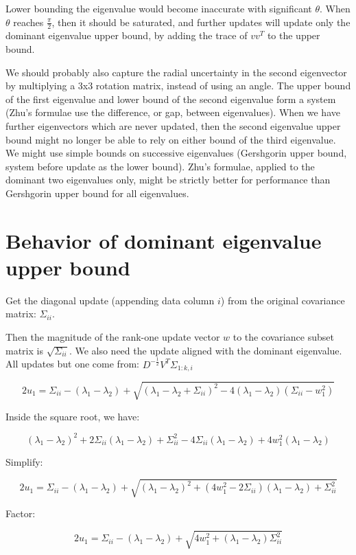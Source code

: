 \documentclass{article}
\begin{document}
Lower bounding the eigenvalue would become inaccurate with significant $\theta$. When $\theta$ reaches $\frac{\pi}{2}$, then it should be saturated, and further updates will update only the dominant eigenvalue upper bound, by adding the trace of $v v^T$ to the upper bound.

We should probably also capture the radial uncertainty in the second eigenvector by multiplying a 3x3 rotation matrix, instead of using an angle. The upper bound of the first eigenvalue and lower bound of the second eigenvalue form a system (Zhu's formulae use the difference, or gap, between eigenvalues). When we have further eigenvectors which are never updated, then the second eigenvalue upper bound might no longer be able to rely on either bound of the third eigenvalue. We might use simple bounds on successive eigenvalues (Gershgorin upper bound, system before update as the lower bound). Zhu's formulae, applied to the dominant two eigenvalues only, might be strictly better for performance than Gershgorin upper bound for all eigenvalues.

\section{Behavior of dominant eigenvalue upper bound}

Get the diagonal update (appending data column $i$) from the original covariance matrix: $\Sigma_{ii}$.

Then the magnitude of the rank-one update vector $w$ to the covariance subset matrix is $\sqrt{\Sigma_{ii}}$.
We also need the update aligned with the dominant eigenvalue. All updates but one come from: $D^{-\frac{1}{2}} V^T \Sigma_{1:k,i}$

$$
2 u_1 = \Sigma_{ii} - (\lambda_1 - \lambda_2) + \sqrt{\left(\lambda_1 - \lambda_2 + \Sigma_{ii} \right)^2 - 4(\lambda_1 - \lambda_2)(\Sigma_{ii} - w_1^2)}
$$

Inside the square root, we have:

$$
(\lambda_1 - \lambda_2)^2 + 2\Sigma_{ii} (\lambda_1 - \lambda_2) + \Sigma_{ii}^2
- 4\Sigma_{ii} (\lambda_1 - \lambda_2) + 4w_1^2 (\lambda_1 - \lambda_2)
$$

Simplify:

$$
2u_1
=
\Sigma_{ii} - (\lambda_1 - \lambda_2)
+
\sqrt{(\lambda_1 - \lambda_2)^2 + (4w_1^2 - 2\Sigma_{ii})(\lambda_1 - \lambda_2) + \Sigma_{ii}^2}
$$

Factor:

$$
2u_1 =
\Sigma_{ii}
- (\lambda_1 - \lambda_2)
+ \sqrt{4w_1^2 + (\lambda_1 - \lambda_2) \Sigma_{ii}^2}
$$
\end{document}
